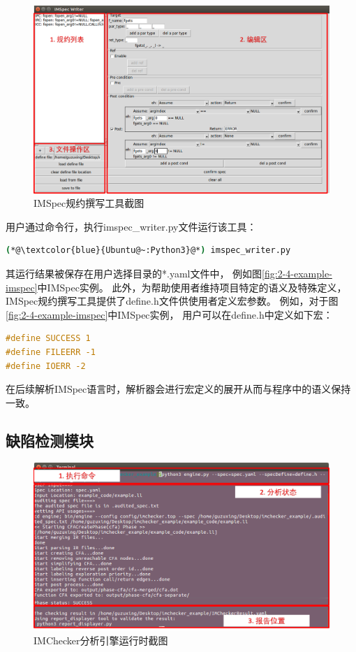 \begin{figure}[t]
	\centering
	\includegraphics[width=0.85\linewidth]{figures/cp4-IMSpec-writer.png}
	\caption{
		IMSpec规约撰写工具截图
	}
	\label{fig:4-3-IMSpec-writer}
\end{figure}

用户通过命令行，执行imspec\_writer.py文件运行该工具：
\begin{lstlisting}[language={bash},
basicstyle=\linespread{0.8}\listingsfont,
numbers=none,
xleftmargin=.3\textwidth]
(*@\textcolor{blue}{Ubuntu@~:Python3}@*) imspec_writer.py
\end{lstlisting}
其运行结果被保存在用户选择目录的*.yaml文件中，
例如图\ref{fig:2-4-example-imspec}中IMSpec实例。
此外，为帮助使用者维持项目特定的语义及特殊定义，
IMSpec规约撰写工具提供了define.h文件供使用者定义宏参数。
例如，对于图\ref{fig:2-4-example-imspec}中IMSpec实例，
用户可以在define.h中定义如下宏：
\begin{lstlisting}[language={C},
basicstyle=\linespread{0.8}\listingsfont,
numbers=none,
xleftmargin=.3\textwidth]
#define SUCCESS 1
#define FILEERR -1
#define IOERR -2
\end{lstlisting}
在后续解析IMSpec语言时，解析器会进行宏定义的展开从而与程序中的语义保持一致。




\subsection{缺陷检测模块}
\begin{figure}[b]
	\centering
	\includegraphics[width=0.85\linewidth]{figures/cp4-IMChecker-engine.png}
	\caption{
		IMChecker分析引擎运行时截图
	}
	\label{fig:4-3-IMChecker-engine}
\end{figure}

